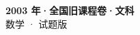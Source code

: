 \documentclass[zihao=-4, a4paper]{ctexart}
\begin{document}
\begin{center}
  {\Large\bfseries 2003 年·全国旧课程卷·文科}\\[4pt]
  {\large 数学 · 试题版}
\end{center}
\medskip
{}

\end{document}

